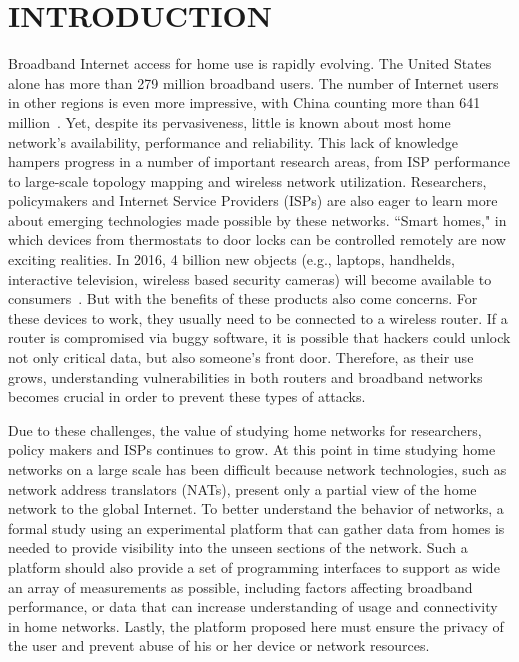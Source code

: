 \chapter{INTRODUCTION}
\label{sec.introduction}
Broadband Internet access for home use is rapidly evolving. The United States
alone has more than 279 million broadband users. The number of Internet 
users in other regions is even more impressive, with China counting more 
than 641 million~\cite{asia}. Yet, despite its pervasiveness, little is 
known about most home network's availability, performance and reliability. This lack of knowledge hampers progress in a number of important research 
areas, from ISP performance to large-scale
topology mapping and wireless network utilization. Researchers, policymakers 
and Internet Service Providers (ISPs) are also eager to learn more about 
emerging technologies made possible by these networks. ``Smart homes," in 
which devices from thermostats to door locks can be controlled remotely are
 now exciting realities. In 2016, 4 billion new objects (e.g., laptops, 
handhelds, interactive television, wireless based security cameras) will 
become available to consumers~\cite{gartner}. But with the benefits of these 
products also come concerns. For these devices to work, they usually need to 
be connected to a wireless router. If a router is compromised via buggy 
software, it is possible that hackers could unlock not only critical data, 
but also someone's front door. Therefore, as their use grows, understanding 
vulnerabilities in both routers and broadband networks becomes crucial in 
order to prevent these types of attacks.

Due to these challenges, the value of studying home networks for researchers, 
policy makers and ISPs continues to grow. At this point in time studying 
home networks on a large scale has been difficult because network 
technologies, such as network address translators (NATs), present only a 
partial view of the home network to the global Internet. To better understand 
the behavior of networks, a formal study using an experimental platform that 
can gather data from homes is needed to provide visibility into the 
unseen sections of the network. Such a platform should also provide a set of 
programming interfaces to support as wide an array of measurements as 
possible, including factors affecting broadband performance, or data that 
can increase understanding of usage and connectivity in home networks.
Lastly, the platform proposed here must ensure the privacy of the 
user and prevent abuse of his or her device or network resources.


